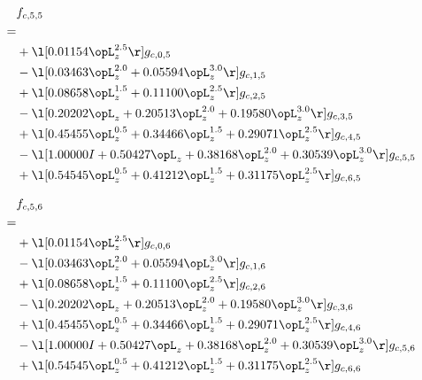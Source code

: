 \begin{alignat}{2} 
\label{eq:f_55_0} 
& f_{c,5,5} \nonumber \\ 
 = \\ 
& + \l[  0.01154 \opL_z^{2.5}  \r] g_{c,0,5} \nonumber \\ 
& - \l[  0.03463 \opL_z^{2.0} +  0.05594 \opL_z^{3.0}  \r] g_{c,1,5} \nonumber \\ 
& + \l[  0.08658 \opL_z^{1.5} +  0.11100 \opL_z^{2.5}  \r] g_{c,2,5} \nonumber \\ 
& - \l[  0.20202 \opL_z +  0.20513 \opL_z^{2.0} +  0.19580 \opL_z^{3.0}  \r] g_{c,3,5} \nonumber \\ 
& + \l[  0.45455 \opL_z^{0.5} +  0.34466 \opL_z^{1.5} +  0.29071 \opL_z^{2.5}  \r] g_{c,4,5} \nonumber \\ 
& - \l[  1.00000 I +  0.50427 \opL_z +  0.38168 \opL_z^{2.0} +  0.30539 \opL_z^{3.0}  \r] g_{c,5,5} \nonumber \\ 
& + \l[  0.54545 \opL_z^{0.5} +  0.41212 \opL_z^{1.5} +  0.31175 \opL_z^{2.5}  \r] g_{c,6,5} \nonumber \\ 
\end{alignat} 


\begin{alignat}{2} 
\label{eq:f_56_0} 
& f_{c,5,6} \nonumber \\ 
 = \\ 
& + \l[  0.01154 \opL_z^{2.5}  \r] g_{c,0,6} \nonumber \\ 
& - \l[  0.03463 \opL_z^{2.0} +  0.05594 \opL_z^{3.0}  \r] g_{c,1,6} \nonumber \\ 
& + \l[  0.08658 \opL_z^{1.5} +  0.11100 \opL_z^{2.5}  \r] g_{c,2,6} \nonumber \\ 
& - \l[  0.20202 \opL_z +  0.20513 \opL_z^{2.0} +  0.19580 \opL_z^{3.0}  \r] g_{c,3,6} \nonumber \\ 
& + \l[  0.45455 \opL_z^{0.5} +  0.34466 \opL_z^{1.5} +  0.29071 \opL_z^{2.5}  \r] g_{c,4,6} \nonumber \\ 
& - \l[  1.00000 I +  0.50427 \opL_z +  0.38168 \opL_z^{2.0} +  0.30539 \opL_z^{3.0}  \r] g_{c,5,6} \nonumber \\ 
& + \l[  0.54545 \opL_z^{0.5} +  0.41212 \opL_z^{1.5} +  0.31175 \opL_z^{2.5}  \r] g_{c,6,6} \nonumber \\ 
\end{alignat} 


